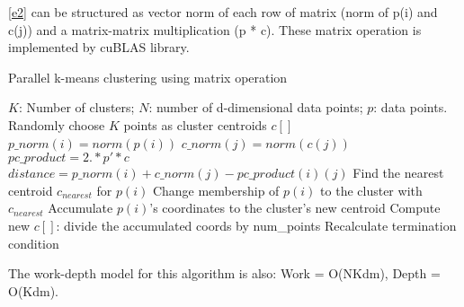 \documentclass{article}
\begin{document}
\ref{e2} can be structured as vector norm of each row of matrix (norm of p(i) and c(j)) and
a matrix-matrix multiplication (p * c). These matrix operation is implemented by cuBLAS library. 
\begin{algorithm}[!htp]
  \caption{Parallel k-means clustering using matrix operation} \label{par_m}
  \begin{algorithmic}[1]
    \INPUT $K$: Number of clusters; $N$: number of d-dimensional data points; $p$: data points.
     \label{alg:pm}
    \State Randomly choose $K$ points as cluster centroids $c[]$
    \State $p\_norm(i) = norm(p(i))$
    \EndFor
    \State $c\_norm(j) = norm(c(j))$
    \EndFor
    \State $pc\_product = 2 .* p' * c$
    \State $distance = p\_norm(i) + c\_norm(j) - pc\_product(i)(j)$
    \EndFor
    \State Find the nearest centroid $c_{nearest}$ for $p(i)$
    \State Change membership of $p(i)$ to the cluster with $c_{nearest}$
    \State Accumulate $p(i)$'s coordinates to the cluster's new centroid
    \EndParFor
    \State Compute new $c[]$: divide the accumulated coords by num\_points
    \State Recalculate termination condition
    \EndWhile
    \EndFunction
  \end{algorithmic}
\end{algorithm}
The work-depth model for this algorithm is also: Work = O(NKdm), Depth = O(Kdm).




\end{document}
